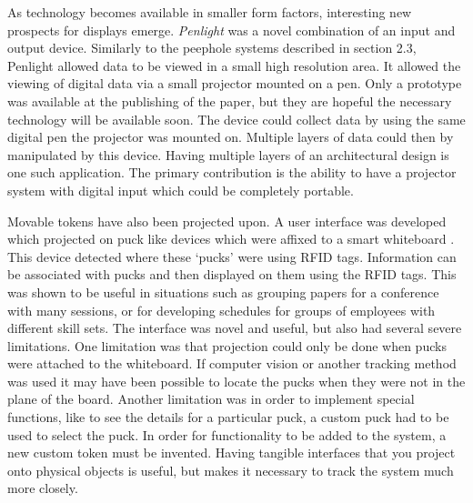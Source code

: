 As technology becomes available in smaller form factors, interesting new prospects for displays emerge.  \emph{Penlight} \cite{1518726} was a novel combination of an input and output device.  Similarly to the peephole systems described in section 2.3\cite{Ishii97tangiblebits}, Penlight allowed data to be viewed in a small high resolution area.  It allowed the viewing of digital data via a small projector mounted on a pen.  Only a prototype was available at the publishing of the paper, but they are hopeful the necessary technology will be available soon.  The device could collect data by using the same digital pen the projector was mounted on.  Multiple layers of data could then by manipulated by this device. Having multiple layers of an architectural design is one such application.  The primary contribution is the ability to have a projector system with digital input which could be completely portable.

\begin{comment}
Maybe not relevant, go back and look at paper
Work has also been done to create more immersive environments using traditional displays.  \emph{Deskotheque}\cite{4811010} is a distributed system using many display surfaces. These surfaces of varying sizes and resolutions are accessible from the same terminal.  All of these displays are able to be accessed from various workstations allowing users to simultaneously be occupying the same workspaces.  It primarily uses X extensions as well as Compiz and Beryl. Similarly to our work, structured light is used for the calibration. It has many interesting applications such as how to use multiple pointers, how to overlap displays and how to make a real time display system. 
\end{comment}

Movable tokens have also been projected upon.  A user interface was developed which projected on puck like devices which were affixed to a smart whiteboard \cite{Jacob01atangible}.  This device detected where these `pucks' were using RFID tags.  Information can be associated with pucks and then displayed on them using the RFID tags.  This was shown to be useful in situations such as grouping papers for a conference with many sessions, or for developing schedules for groups of employees with different skill sets.  The interface was novel and useful, but also had several severe limitations.  One limitation was that projection could only be done when pucks were attached to the whiteboard.  If computer vision or another tracking method was used it may have been possible to locate the pucks when they were not in the plane of the board.  Another limitation was in order to implement special functions, like to see the details for a particular puck, a custom puck had to be used to select the puck.  In order for functionality to be added to the system, a new custom token must be invented. Having tangible interfaces that you project onto physical objects is useful, but makes it necessary to track the system much more closely.

